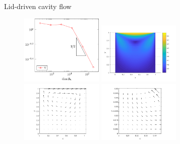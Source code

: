 \documentclass[10pt]{beamer}
\begin{document}
\begin{frame}{ Lid-driven cavity flow}
\begin{figure}
  \begin{center}
  \includegraphics[width=0.35\textwidth]{plots_stokes2.pdf}
  \includegraphics[width=0.35\textwidth]{LidDrivenVfield.png}
    \includegraphics[width=0.35\textwidth]{LidDrivenVortexBig.png}
    \includegraphics[width=0.35\textwidth]{LidDrivenVortexSmall.png}
  \end{center}
\end{figure}
\end{frame}
\end{document}
